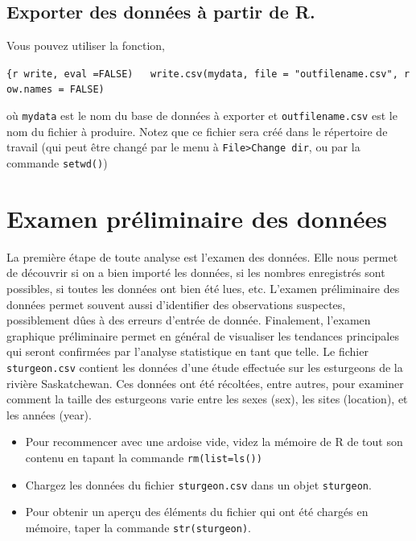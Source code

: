 \documentclass[12pt,]{book}
\providecommand{\tightlist}{%
  \setlength{\itemsep}{0pt}\setlength{\parskip}{0pt}}
\begin{document}
\hypertarget{exporter-des-donnuxe9es-uxe0-partir-de-r.}{%
\subsection{Exporter des données à partir de R.}\label{exporter-des-donnuxe9es-uxe0-partir-de-r.}}

Vous pouvez utiliser la fonction,

\texttt{\{r\ write,\ eval\ =FALSE)\ \ \ write.csv(mydata,\ file\ =\ "outfilename.csv",\ row.names\ =\ FALSE)}

où \texttt{mydata} est le nom du base de données à exporter et \texttt{outfilename.csv} est le nom du fichier à produire.
Notez que ce fichier sera créé dans le répertoire de travail (qui peut être changé par le menu à \texttt{File\textgreater{}Change\ dir}, ou par la commande \texttt{setwd()})

\hypertarget{examen-pruxe9liminaire-des-donnuxe9es}{%
\section{Examen préliminaire des données}\label{examen-pruxe9liminaire-des-donnuxe9es}}

La première étape de toute analyse est l'examen des données.
Elle nous permet de découvrir si on a bien importé les données, si les nombres enregistrés sont possibles, si toutes les données ont bien été lues, etc.
L'examen préliminaire des données permet souvent aussi d'identifier des observations suspectes, possiblement dûes à des erreurs d'entrée de donnée.
Finalement, l'examen graphique préliminaire permet en général de visualiser les tendances principales qui seront confirmées par l'analyse statistique en tant que telle.
Le fichier \texttt{sturgeon.csv} contient les données d'une étude effectuée sur les esturgeons de la rivière Saskatchewan.
Ces données ont été récoltées, entre autres, pour examiner comment la taille des esturgeons varie entre les sexes (sex), les sites (location), et les années (year).

\begin{itemize}
\tightlist
\item
  Pour recommencer avec une ardoise vide, videz la mémoire de R de tout son contenu en tapant la commande \texttt{rm(list=ls())}
\item
  Chargez les données du fichier \texttt{sturgeon.csv} dans un objet \texttt{sturgeon}.
\item
  Pour obtenir un aperçu des éléments du fichier qui ont été chargés en mémoire, taper la commande \texttt{str(sturgeon)}.
\end{itemize}
\end{document}
